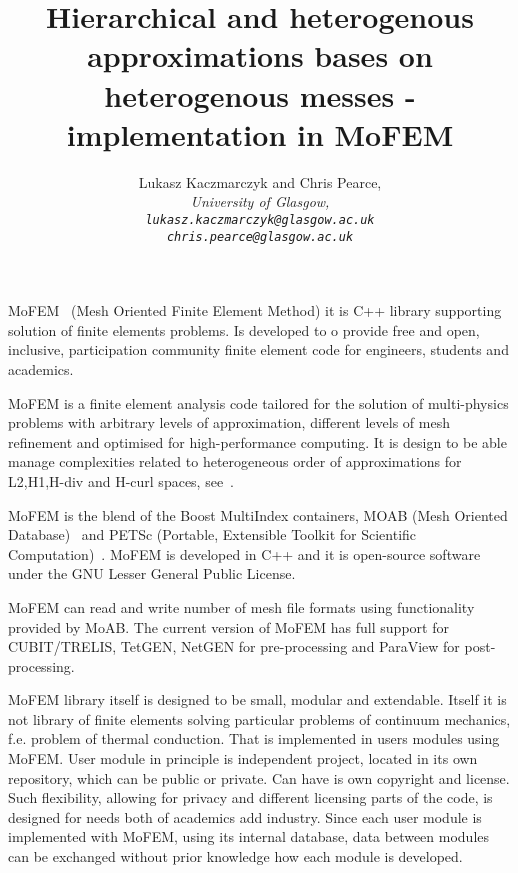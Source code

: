 \documentclass{article}
\begin{document}
\title{Hierarchical and heterogenous approximations bases on heterogenous messes - implementation in MoFEM}
\author{%
  Lukasz Kaczmarczyk and Chris Pearce,\\
  \em{University of Glasgow},\\
  \texttt{lukasz.kaczmarczyk@glasgow.ac.uk}\\
  \texttt{chris.pearce@glasgow.ac.uk}\\
}
\maketitle

MoFEM~\cite{MoFEMWebPage} (Mesh Oriented Finite Element Method) it is C++ library supporting
solution of finite elements problems. Is developed to o provide free and open,
inclusive, participation community finite element code for engineers, students
and academics.

MoFEM is a finite element analysis code tailored for the solution of
multi-physics problems with arbitrary levels of approximation, different levels
of mesh refinement and optimised for high-performance computing. It is design to
be able manage complexities related to heterogeneous order of approximations for
L2,H1,H-div and H-curl spaces, see~\cite{ainsworth2001essential}.

MoFEM is the blend of the Boost MultiIndex containers, MOAB (Mesh Oriented
Database)~\cite{tautges2010canonical} and PETSc (Portable, Extensible Toolkit
for Scientific Computation)~\cite{petsc-web-page}. MoFEM is developed in C++ and
it is open-source software under the GNU Lesser General Public License.

MoFEM can read and write number of mesh file formats using functionality
provided by MoAB. The current version of MoFEM has full support for
CUBIT/TRELIS, TetGEN, NetGEN for pre-processing and ParaView for
post-processing.

MoFEM library itself is designed to be small, modular and extendable. Itself it
is not library of finite elements solving particular problems of continuum
mechanics, f.e. problem of thermal conduction. That is implemented in users
modules using MoFEM. User module in principle is independent project, located in
its own repository, which can be public or private. Can have is own copyright
and license. Such flexibility, allowing for privacy and different licensing
parts of the code, is designed for needs both of academics add industry. Since
each user module is implemented with MoFEM, using its internal database, data
between modules can be exchanged without prior knowledge how each module is
developed.

%

{}

\end{document}

